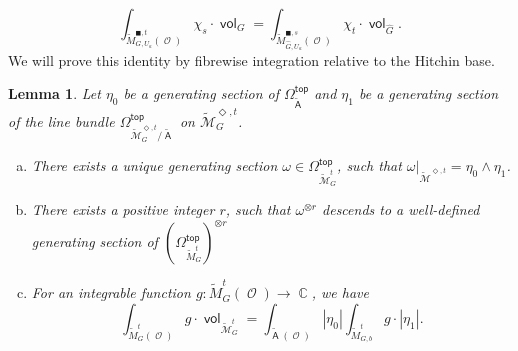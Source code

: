 \documentclass{article}
\DeclareMathOperator{\A}{\mathsf{A}}
\DeclareMathOperator{\Cb}{\mathbb{C}}
\newcommand{\Mc}{\mathcal{M}}
\DeclareMathOperator{\vol}{\mathsf{vol}}
\DeclareMathOperator{\Oo}{\mathcal{O}}
\renewcommand{\top}{\mathsf{top}}
\theoremstyle{definition}
\theoremstyle{plain}
\newtheorem{lemma}[definition]{Lemma}
\begin{document}
\begin{equation}\label{uauaua} 
  \int_{\widetilde{M}_{G,U_a}^{\blacksquare,t}(\Oo)} \chi_s \cdot \vol_G =  \int_{\widetilde{M}_{\widehat{G},U_a}^{\blacksquare,s}(\Oo)} \chi_t \cdot \vol_{\widehat{G}}.
\end{equation}
 We will prove this identity by fibrewise integration relative to the Hitchin base. 
\begin{lemma}\label{lemma:relative}
Let $\eta_0$ be a generating section of $\Omega_{\widetilde{\A}}^{\top}$ and $\eta_1 $ be a generating section of the line bundle $\Omega^{\top}_{\widetilde{\Mc}^{\Diamond,t}_{G}/\widetilde{\A}}$ on $\widetilde{\Mc}^{\Diamond,t}_{G}$.
\begin{enumerate}[(a)]
\item There exists a unique generating section $\omega \in \Omega^{\top}_{\widetilde{\Mc}_G^t}$, such that $\omega|_{\widetilde{\Mc}^{\Diamond,t}} = \eta_0 \wedge \eta_1$.
\item There exists a positive integer $r$, such that $\omega^{\otimes r}$ descends to a well-defined generating section of $(\Omega^{\top}_{\widetilde{M}_G^t})^{\otimes r}$
\item For an integrable function $g\colon \widetilde{M}_G^t(\Oo) \to \Cb$, we have
$$\int_{\widetilde{M}_G^t(\Oo)} g \cdot{} \vol_{\widetilde{\Mc}_G^t} = \int_{\widetilde{\A}(\Oo)} |\eta_0| \int_{\widetilde{M}^t_{G,b}} g\cdot{} |\eta_1|.$$
\end{enumerate}
\end{lemma}
\end{document}
